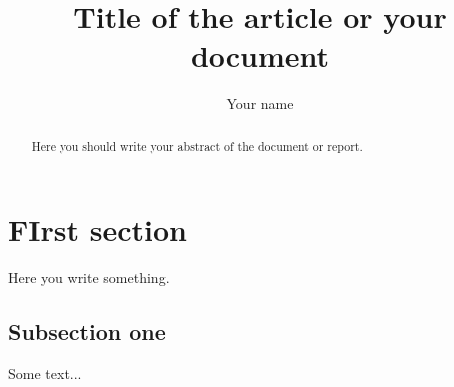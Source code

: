 \documentclass[]{article}
\title{Title of the article or your document}
\author{Your name}
\begin{document}
\maketitle

\begin{abstract}
Here you should write your abstract of the document or report.
\end{abstract}

\section{FIrst section}
Here you write something. 
\subsection{Subsection one}
Some text...
\end{document}

